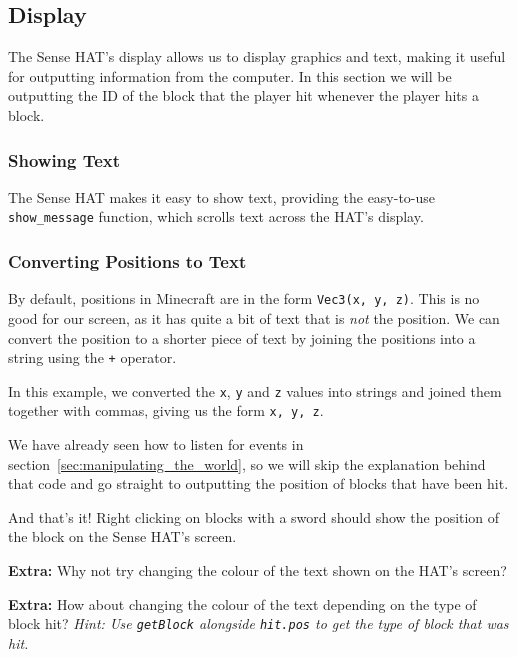 	\subsection{Display}

		The Sense HAT's display allows us to display graphics and text, making it useful for outputting information from the computer. In this section we will be outputting the ID of the block that the player hit whenever the player hits a block.

			\subsubsection{Showing Text}

				The Sense HAT makes it easy to show text, providing the easy-to-use \texttt{show\_message} function, which scrolls text across the HAT's display.

				

			\subsubsection{Converting Positions to Text}

				By default, positions in Minecraft are in the form \texttt{Vec3(x, y, z)}. This is no good for our screen, as it has quite a bit of text that is \textit{not} the position. We can convert the position to a shorter piece of text by joining the positions into a string using the \texttt{+} operator.

				

				In this example, we converted the \texttt{x}, \texttt{y} and \texttt{z} values into strings and joined them together with commas, giving us the form \texttt{x, y, z}.

				We have already seen how to listen for events in section~\ref{sec:manipulating_the_world}, so we will skip the explanation behind that code and go straight to outputting the position of blocks that have been hit.

				

				And that's it! Right clicking on blocks with a sword should show the position of the block on the Sense HAT's screen.

				\textbf{Extra:} Why not try changing the colour of the text shown on the HAT's screen?

				\textbf{Extra:} How about changing the colour of the text depending on the type of block hit? \textit{Hint: Use \texttt{getBlock} alongside \texttt{hit.pos} to get the type of block that was hit.}

